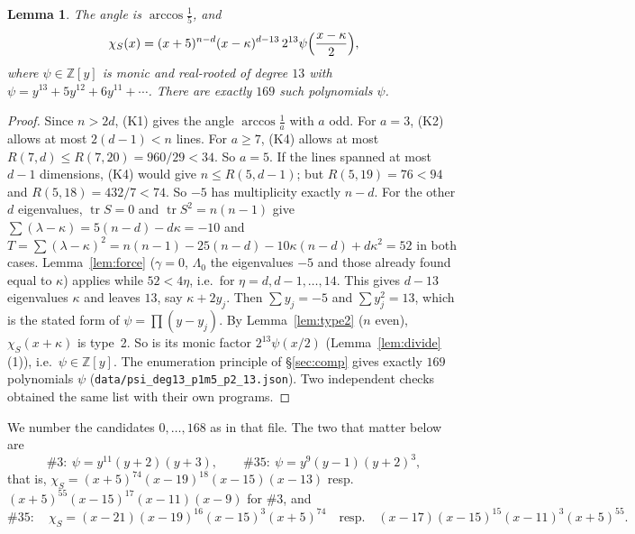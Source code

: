 \documentclass[11pt]{article}
\newtheorem{lemma}[theorem]{Lemma}
\theoremstyle{definition}
\newcommand{\Z}{\mathbb{Z}}
\newcommand{\tr}{\operatorname{tr}}
\begin{document}
\begin{lemma}\label{lem:169}
The angle is $\arccos\frac15$, and
\[
\chi_S(x)=(x+5)^{n-d}(x-\kappa)^{d-13}\,2^{13}\psi\Bigl(\frac{x-\kappa}2\Bigr),
\]
where $\psi\in\Z[y]$ is monic and real-rooted of degree $13$ with $\psi=y^{13}+5y^{12}+6y^{11}+\cdots$.
There are exactly $169$ such polynomials $\psi$.
\end{lemma}
\begin{proof}
Since $n>2d$, (K1) gives the angle $\arccos\frac1a$ with $a$ odd. For $a=3$, (K2) allows at most
$2(d-1)<n$ lines. For $a\ge7$, (K4) allows at most $R(7,d)\le R(7,20)=960/29<34$. So $a=5$. If the
lines spanned at most $d-1$ dimensions, (K4) would give $n\le R(5,d-1)$; but $R(5,19)=76<94$ and
$R(5,18)=432/7<74$. So $-5$ has multiplicity exactly $n-d$. For the other $d$ eigenvalues,
$\tr S=0$ and $\tr S^2=n(n-1)$ give
$\sum(\lambda-\kappa)=5(n-d)-d\kappa=-10$ and
$T=\sum(\lambda-\kappa)^2=n(n-1)-25(n-d)-10\kappa(n-d)+d\kappa^2=52$ in both cases.
Lemma~\ref{lem:force} ($\gamma=0$, $\Lambda_0$ the eigenvalues $-5$ and those already found equal to
$\kappa$) applies while $52<4\eta$, i.e.\ for $\eta=d,d-1,\dots,14$. This gives $d-13$ eigenvalues
$\kappa$ and leaves $13$, say $\kappa+2y_j$. Then $\sum y_j=-5$ and $\sum y_j^2=13$, which is the
stated form of $\psi=\prod(y-y_j)$. By Lemma~\ref{lem:type2} ($n$ even), $\chi_S(x+\kappa)$ is
type~2. So is its monic factor $2^{13}\psi(x/2)$ (Lemma~\ref{lem:divide}(1)), i.e.\ $\psi\in\Z[y]$.
The enumeration principle of \S\ref{sec:comp} gives exactly $169$ polynomials $\psi$
(\texttt{data/psi\_deg13\_p1m5\_p2\_13.json}). Two independent checks obtained
the same list with their own programs.
\end{proof}

We number the candidates $0,\dots,168$ as in that file. The two that matter below are
\[
\#3:\ \psi=y^{11}(y+2)(y+3),\qquad \#35:\ \psi=y^9(y-1)(y+2)^3,
\]
that is, $\chi_S=(x+5)^{74}(x-19)^{18}(x-15)(x-13)$ resp.\ $(x+5)^{55}(x-15)^{17}(x-11)(x-9)$ for
\#3, and
\[
\#35:\quad \chi_S=(x-21)(x-19)^{16}(x-15)^3(x+5)^{74}\quad\text{resp.}\quad
(x-17)(x-15)^{15}(x-11)^3(x+5)^{55}.
\]
\end{document}
